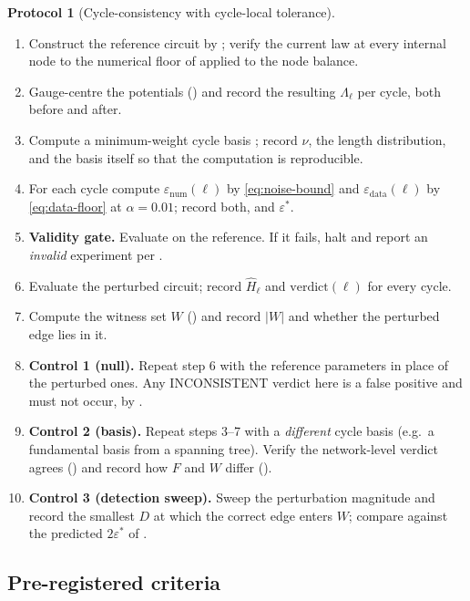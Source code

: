\documentclass[11pt,twocolumn,a4paper]{article}
\theoremstyle{pstyle}
\theoremstyle{definition}
\newtheorem{protocol}[theorem]{Protocol}
\theoremstyle{remark}
\newcommand{\abs}[1]{\lvert#1\rvert}
\newcommand{\eps}{\varepsilon}
\newcommand{\epsnum}{\eps_{\mathrm{num}}}
\newcommand{\epsdata}{\eps_{\mathrm{data}}}
\newcommand{\epsstar}{\eps^{\ast}}
\newcommand{\hol}{H}
\begin{document}
\begin{protocol}[Cycle-consistency with cycle-local tolerance]
\label{prot:main}
\leavevmode
\begin{enumerate}[leftmargin=1.5em,itemsep=3pt]
\item Construct the reference circuit by
; verify the current law at every internal
node to the numerical floor of  applied to the
node balance.
\item Gauge-centre the potentials () and record the
resulting $\Lambda_\ell$ per cycle, both before and after.
\item Compute a minimum-weight cycle basis \citep{horton1987}; record
$\nu$, the length distribution, and the basis itself so that the
computation is reproducible.
\item For each cycle compute $\epsnum(\ell)$ by \eqref{eq:noise-bound}
and $\epsdata(\ell)$ by \eqref{eq:data-floor} at $\alpha=0.01$; record
both, and $\epsstar$.
\item \textbf{Validity gate.} Evaluate  on the
reference. If it fails, halt and report an \emph{invalid} experiment per
.
\item Evaluate the perturbed circuit; record $\widehat{\hol}_\ell$ and
$\mathrm{verdict}(\ell)$ for every cycle.
\item Compute the witness set $W$ () and record
$\abs{W}$ and whether the perturbed edge lies in it.
\item \textbf{Control 1 (null).} Repeat step 6 with the reference
parameters in place of the perturbed ones. Any \textsf{INCONSISTENT}
verdict here is a false positive and must not occur, by
.
\item \textbf{Control 2 (basis).} Repeat steps 3--7 with a
\emph{different} cycle basis (e.g.\ a fundamental basis from a spanning
tree). Verify the network-level verdict agrees
() and record how $F$ and $W$ differ
().
\item \textbf{Control 3 (detection sweep).} Sweep the perturbation
magnitude and record the smallest $D$ at which the correct edge enters
$W$; compare against the predicted $2\epsstar$ of
.
\end{enumerate}
\end{protocol}

\subsection{Pre-registered criteria}
\end{document}
